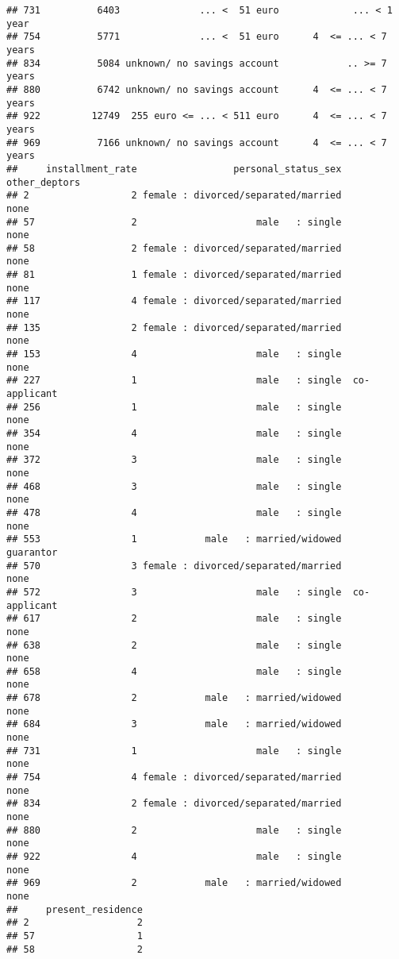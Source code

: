 \documentclass[
]{article}
\begin{document}
\begin{verbatim}
## 731          6403              ... <  51 euro             ... < 1 year
## 754          5771              ... <  51 euro      4  <= ... < 7 years
## 834          5084 unknown/ no savings account            .. >= 7 years
## 880          6742 unknown/ no savings account      4  <= ... < 7 years
## 922         12749  255 euro <= ... < 511 euro      4  <= ... < 7 years
## 969          7166 unknown/ no savings account      4  <= ... < 7 years
##     installment_rate                 personal_status_sex other_deptors
## 2                  2 female : divorced/separated/married          none
## 57                 2                     male   : single          none
## 58                 2 female : divorced/separated/married          none
## 81                 1 female : divorced/separated/married          none
## 117                4 female : divorced/separated/married          none
## 135                2 female : divorced/separated/married          none
## 153                4                     male   : single          none
## 227                1                     male   : single  co-applicant
## 256                1                     male   : single          none
## 354                4                     male   : single          none
## 372                3                     male   : single          none
## 468                3                     male   : single          none
## 478                4                     male   : single          none
## 553                1            male   : married/widowed     guarantor
## 570                3 female : divorced/separated/married          none
## 572                3                     male   : single  co-applicant
## 617                2                     male   : single          none
## 638                2                     male   : single          none
## 658                4                     male   : single          none
## 678                2            male   : married/widowed          none
## 684                3            male   : married/widowed          none
## 731                1                     male   : single          none
## 754                4 female : divorced/separated/married          none
## 834                2 female : divorced/separated/married          none
## 880                2                     male   : single          none
## 922                4                     male   : single          none
## 969                2            male   : married/widowed          none
##     present_residence
## 2                   2
## 57                  1
## 58                  2

\end{verbatim}
\end{document}

